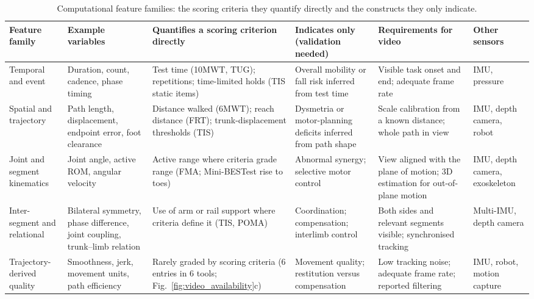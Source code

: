 
\begin{table}[t]
\centering
\caption{Computational feature families: the scoring criteria they quantify directly and the constructs they only indicate.}
\label{tab:computational_feature_families}
\setlength{\tabcolsep}{4pt}
\renewcommand{\arraystretch}{1.15}
\small
\begin{tabularx}{\textwidth}{@{}
>{\RaggedRight\arraybackslash}p{}
>{\RaggedRight\arraybackslash}p{}
>{\RaggedRight\arraybackslash}X
>{\RaggedRight\arraybackslash}p{}
>{\RaggedRight\arraybackslash}p{}
>{\RaggedRight\arraybackslash}p{}
@{}}
\toprule
\textbf{Feature family} & \textbf{Example variables} & \textbf{Quantifies a scoring criterion directly} & \textbf{Indicates only (validation needed)} & \textbf{Requirements for video} & \textbf{Other sensors} \\
\midrule
Temporal and event & Duration, count, cadence, phase timing & Test time (10MWT, TUG); repetitions; time-limited holds (TIS static items) & Overall mobility or fall risk inferred from test time & Visible task onset and end; adequate frame rate & IMU, pressure \\
Spatial and trajectory & Path length, displacement, endpoint error, foot clearance & Distance walked (6MWT); reach distance (FRT); trunk-displacement thresholds (TIS) & Dysmetria or motor-planning deficits inferred from path shape & Scale calibration from a known distance; whole path in view & IMU, depth camera, robot \\
Joint and segment kinematics & Joint angle, active ROM, angular velocity & Active range where criteria grade range (FMA; Mini-BESTest rise to toes) & Abnormal synergy; selective motor control & View aligned with the plane of motion; 3D estimation for out-of-plane motion & IMU, depth camera, exoskeleton \\
Inter-segment and relational & Bilateral symmetry, phase difference, joint coupling, trunk--limb relation & Use of arm or rail support where criteria define it (TIS, POMA) & Coordination; compensation; interlimb control & Both sides and relevant segments visible; synchronised tracking & Multi-IMU, depth camera \\
Trajectory-derived quality & Smoothness, jerk, movement units, path efficiency & Rarely graded by scoring criteria (6 entries in 6 tools; Fig.~\ref{fig:video_availability}c) & Movement quality; restitution versus compensation & Low tracking noise; adequate frame rate; reported filtering & IMU, robot, motion capture \\

\end{tabularx}
\end{table}
